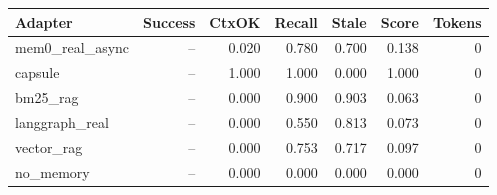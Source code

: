 \begin{tabular}{lrrrrrr}
\hline
Adapter & Success & CtxOK & Recall & Stale & Score & Tokens \\
\hline
mem0\_real\_async & -- & 0.020 & 0.780 & 0.700 & 0.138 & 0 \\
capsule & -- & 1.000 & 1.000 & 0.000 & 1.000 & 0 \\
bm25\_rag & -- & 0.000 & 0.900 & 0.903 & 0.063 & 0 \\
langgraph\_real & -- & 0.000 & 0.550 & 0.813 & 0.073 & 0 \\
vector\_rag & -- & 0.000 & 0.753 & 0.717 & 0.097 & 0 \\
no\_memory & -- & 0.000 & 0.000 & 0.000 & 0.000 & 0 \\
\hline
\end{tabular}

